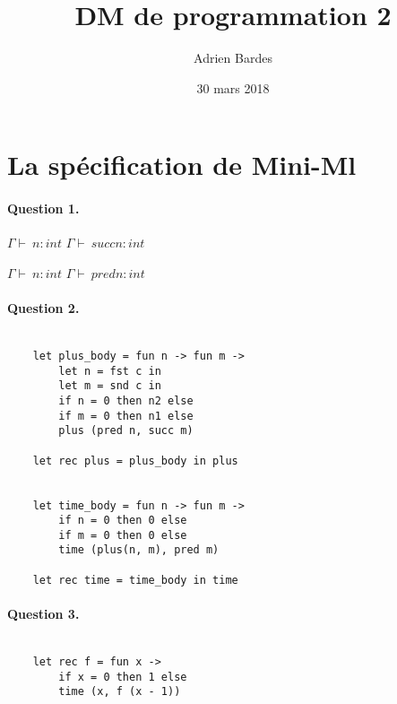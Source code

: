 \documentclass{article}
\title{DM de programmation 2}
\author{Adrien Bardes}
\date{30 mars 2018}
\begin{document}
	\maketitle

	\section{La spécification de Mini-Ml}

	\paragraph{Question 1.}

	\begin{prooftree}
	\def\fCenter{ \vdash\ }
	\Axiom$\Gamma \fCenter n : int$
	\UnaryInf$\Gamma \fCenter succ n : int$
	\end{prooftree}

	\begin{prooftree}
	\def\fCenter{ \vdash\ }
	\Axiom$\Gamma \fCenter n : int$
	\UnaryInf$\Gamma \fCenter pred n : int$
	\end{prooftree}


	\paragraph{Question 2.}

	\begin{verbatim}

	let plus_body = fun n -> fun m -> 
		let n = fst c in
		let m = snd c in
		if n = 0 then n2 else
		if m = 0 then n1 else
		plus (pred n, succ m)

	let rec plus = plus_body in plus


	let time_body = fun n -> fun m ->
		if n = 0 then 0 else
		if m = 0 then 0 else
		time (plus(n, m), pred m)

	let rec time = time_body in time

	\end{verbatim}

	\paragraph{Question 3.}

	\begin{verbatim}

	let rec f = fun x ->
		if x = 0 then 1 else
		time (x, f (x - 1))

	\end{verbatim}
\end{document}
